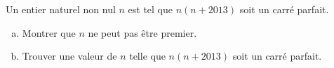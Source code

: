 \documentclass[varwidth]{standalone}
\begin{document}
    Un entier naturel non nul $n$ est tel que $n(n + 2013)$ soit un carr\'e parfait.
    \begin{enumerate}[a)]
        \item Montrer que $n$ ne peut pas \^etre premier.
        \item Trouver une valeur de $n$ telle que $n(n + 2013)$ soit un carr\'e parfait.
    \end{enumerate}
\end{document}
